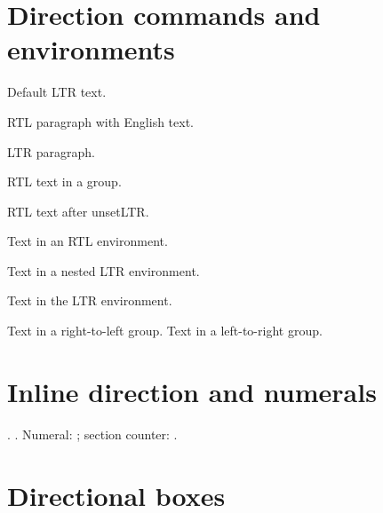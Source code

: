 \documentclass{article}
\makeatletter
\newcommand{\AssertRTL}{%
    \if@RTL\else
    \PackageError{babelbidi-api-core}{Expected RTL direction}{}%
    \fi
}
\newcommand{\AssertLTR}{%
    \if@RTL
    \PackageError{babelbidi-api-core}{Expected LTR direction}{}%
    \fi
}
\makeatother
\begin{document}
    \section{Direction commands and environments}
    Default LTR text.\AssertLTR

    \setRTL\AssertRTL
    RTL paragraph with English text.\par
    \setLTR\AssertLTR
    LTR paragraph.\par

    {\setRL\AssertRTL RTL text in a group.\par}
    \AssertLTR
    {\unsetLTR\AssertRTL RTL text after unsetLTR.\par}
    \AssertLTR
    \setLR\AssertLTR
    \unsetRTL\AssertLTR

    \begin{RTL}
        \AssertRTL Text in an RTL environment.
        \begin{LTR}
            \AssertLTR Text in a nested LTR environment.
        \end{LTR}
        \AssertRTL
    \end{RTL}
    \AssertLTR

    \begin{LTR}
        \AssertLTR Text in the LTR environment.
    \end{LTR}

    \leavevmode\beginR Text in a right-to-left group.\endR
    \beginL Text in a left-to-right group.\endL

    \section{Inline direction and numerals}
     .
     .
    Numeral: ; section counter: .

    \section{Directional boxes}

    \medskip\noindent

    \medskip\noindent
\end{document}
